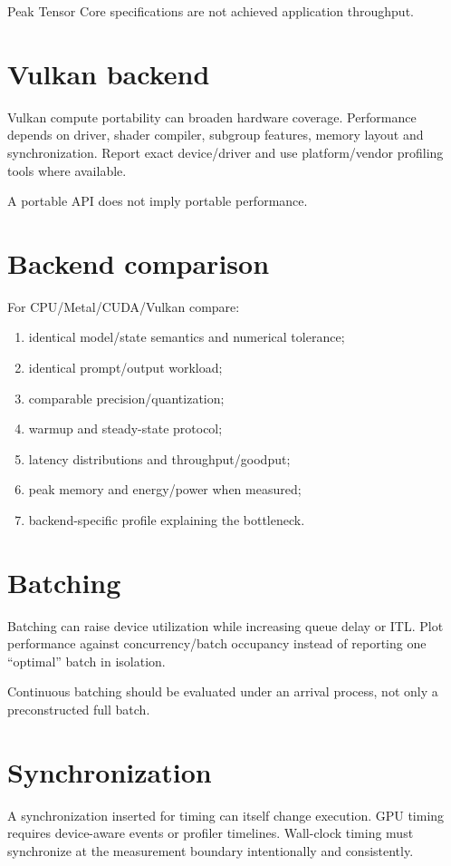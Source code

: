 Peak Tensor Core specifications are not achieved application throughput.

\section{Vulkan backend}
Vulkan compute portability can broaden hardware coverage. Performance depends on driver, shader compiler, subgroup features, memory layout and synchronization. Report exact device/driver and use platform/vendor profiling tools where available.

A portable API does not imply portable performance.

\section{Backend comparison}
For CPU/Metal/CUDA/Vulkan compare:
\begin{enumerate}
\item identical model/state semantics and numerical tolerance;
\item identical prompt/output workload;
\item comparable precision/quantization;
\item warmup and steady-state protocol;
\item latency distributions and throughput/goodput;
\item peak memory and energy/power when measured;
\item backend-specific profile explaining the bottleneck.
\end{enumerate}

\section{Batching}
Batching can raise device utilization while increasing queue delay or ITL. Plot performance against concurrency/batch occupancy instead of reporting one ``optimal'' batch in isolation.

Continuous batching should be evaluated under an arrival process, not only a preconstructed full batch.

\section{Synchronization}
A synchronization inserted for timing can itself change execution. GPU timing requires device-aware events or profiler timelines. Wall-clock timing must synchronize at the measurement boundary intentionally and consistently.

